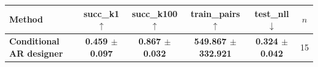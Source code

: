 \begin{tabular}{lccccc}
\toprule
Method & succ\_k1 $\uparrow$ & succ\_k100 $\uparrow$ & train\_pairs $\uparrow$ & test\_nll $\downarrow$ & $n$ \\
\midrule
\textbf{Conditional AR designer} & \textbf{0.459 $\pm$ 0.097} & \textbf{0.867 $\pm$ 0.032} & \textbf{549.867 $\pm$ 332.921} & \textbf{0.324 $\pm$ 0.042} & 15 \\
\bottomrule
\end{tabular}
